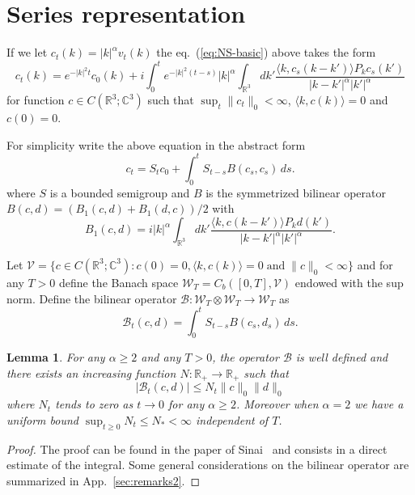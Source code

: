 \documentclass[a4paper,12pt,reqno]{amsart}
\newcommand{\1}{{\bf 1}}
\newcommand{\RR}{\mathbb{R}}
\newcommand{\CC}{\mathbb{C}}
\newtheorem{lemma}[theorem]{Lemma}
\newcommand{\VV}{\mathcal{V}}
\newcommand{\WW}{\mathcal{W}}
\begin{document}
\section{Series representation}
\label{sec:series}
If we let $c_t(k) = |k|^\alpha v_t(k)$ the eq.~(\ref{eq:NS-basic}) above takes the form
\begin{equation}
  \label{eq:NS-c}
c_t(k) = e^{-|k|^2 t} c_0(k) + i \int_0^t e^{-|k|^2 (t-s)} |k|^\alpha
\int_{\RR^3}dk' \frac{\langle k, c_s(k-k')\rangle P_k
c_s(k')}{|k-k'|^{\alpha} |k'|^{\alpha}} 
\end{equation}
for function $c \in C(\RR^3;\CC^3)$ such that $\sup_t \|c_t\|_0 < \infty$, $\langle k,c(k) \rangle = 0$ and $c(0) = 0$.

For simplicity write the above equation in the abstract form
\begin{equation}
  \label{eq:NS-c-abstract}
c_t = S_t c_0 +  \int_0^t S_{t-s}  B(c_s,c_s)\,ds.
\end{equation}
where $S$ is a bounded semigroup and $B$ is the symmetrized bilinear operator
 $ B(c,d) = (B_1(c,d) + B_1(d,c))/2$ with
$$
B_1(c,d) = i  |k|^\alpha
\int_{\RR^3}dk' \frac{\langle k, c(k-k')\rangle P_k
d(k')}{|k-k'|^{\alpha} |k'|^{\alpha}}. 
$$

Let $\VV = \{ c \in C(\RR^3;\CC^3) : c(0) = 0, \langle k,  c(k) \rangle = 0\; \text{and}\; \|c\|_0 <
\infty \}$ and for any $T > 0$ define the Banach space $\WW_T = C_b([0,T], \VV)$ endowed
with the sup norm.  
Define the bilinear operator $\mathcal{B} : \WW_T\otimes \WW_T \to \WW_T$ as
\begin{equation*}
\mathcal{B}_t(c,d) = \int_0^t S_{t-s}  B(c_s,d_s)\,ds.  
\end{equation*}

\begin{lemma}
For any $\alpha \ge 2$ and any $T > 0$, the operator $\mathcal{B}$ is well defined and there exists an
increasing function
$N : \RR_+ \to \RR_+$ such that
\begin{equation}
  \label{eq:estimate-B}
|\mathcal{B}_t(c,d)| \le N_t \|c\|_0 \|d\|_0  
\end{equation}
where  $N_t$ tends to zero as $t \to 0$ for any $\alpha
\ge 2$. Moreover when $\alpha = 2$ we have a uniform bound $\sup_{t \ge
  0} N_t \le  N_* <\infty $ independent of $T$.
\end{lemma}
\begin{proof}
The proof can be found in the paper of Sinai~\cite{Sinai1} and 
consists in a direct estimate of the integral. Some
general considerations on the bilinear operator are summarized in App.~\ref{sec:remarks2}.  
\end{proof}
\end{document}
